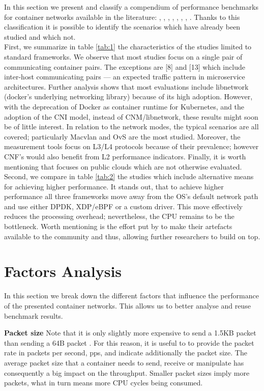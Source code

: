 \documentclass[conference]{IEEEtran}
\begin{document}
In this section we present and classify a compendium of performance benchmarks for container networks available in the literature: 
\cite{IEEE_INFOCOM_2018:K. Suo}, \cite{HotConNet_17:Zhao}, \cite{Nakamura:2018}, \cite{Boeira:2021}, \cite{Bankston:2018}, \cite{CoNEXT:2018}, \cite{ICTC_2018:Park}, \cite{NOMS_2016:Claassen}. Thanks to this classification it is possible to identify the scenarios which have already been studied and which not.\\
First, we summarize in table \ref{tab:1} the characteristics of the studies limited to standard frameworks. We observe that most studies focus on a single pair of communicating container pairs. The exceptions are [8] and [13] which include inter-host communicating pairs --- an expected traffic pattern in microservice architectures. Further analysis shows that most evaluations include libnetwork (docker's underlying networking library) because of its high adoption. However, with the deprecation of Docker as container runtime for Kubernetes, and the adoption of the CNI model, instead of CNM/libnetwork, these results might soon be of little interest. In relation to the network modes, the typical scenarios are all covered; particularly Macvlan and OvS are the most studied. Moreover, the measurement tools focus on L3/L4 protocols because of their prevalence; however CNF's would also benefit from L2 performance indicators. Finally, it is worth mentioning that \cite{Bankston:2018} focuses on public clouds which are not otherwise evaluated.\\
Second, we compare in table \ref{tab:2} the studies which include alternative means for achieving higher performance. It stands out, that to achieve higher performance all three frameworks move away from the OS's default network path and use either DPDK, XDP/eBPF or a custom driver. This move effectively reduces the processing overhead; nevertheless, the CPU remains to be the bottleneck. Worth mentioning is the effort put by \cite{CoNEXT:2018} to make their artefacts available to the community and thus, allowing further researchers to build on top.
\section{Factors Analysis}
In this section we break down the different factors that influence the performance of the presented container networks. This allows us to better analyse and reuse benchmark results.

\noindent\textbf{Packet size}\hspace{0.2cm} 
Note that it is only slightly more expensive to send a 1.5KB packet than sending a 64B packet \cite{Rizzo:2012}. For this reason, it is useful to to provide the packet rate in packets per second, pps, and indicate additionally the packet size. The average packet size that a container needs to send, receive or manipulate has consequently a big impact on the throughput. Smaller packet sizes imply more packets, what in turn means more CPU cycles being consumed.
\end{document}
